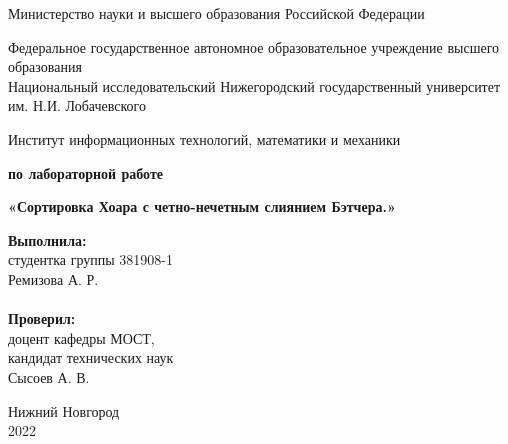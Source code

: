 \documentclass{report}
\begin{document}
\begin{titlepage}

\begin{center}
Министерство науки и высшего образования Российской Федерации
\end{center}

\begin{center}
Федеральное государственное автономное образовательное учреждение высшего образования \\
Национальный исследовательский Нижегородский государственный университет им. Н.И. Лобачевского
\end{center}

\begin{center}
Институт информационных технологий, математики и механики
\end{center}

\vspace{4em}

\begin{center}
\textbf{ по лабораторной работе} \\
\end{center}
\begin{center}
\textbf{\Large«Сортировка Хоара с четно-нечетным слиянием Бэтчера.»} \\
\end{center}

\vspace{4em}

\newbox{\lbox}
\newlength{\maxl}
\setlength{\maxl}{\wd\lbox}
\hfill\parbox{7cm}{
\hspace*{5cm}\hspace*{-5cm}\textbf{Выполнила:} \\ студентка группы 381908-1 \\ Ремизова А. Р.\\
\\
\hspace*{5cm}\hspace*{-5cm}\textbf{Проверил:}\\ доцент кафедры МОСТ, \\ кандидат технических наук \\ Сысоев А. В.\\
}
\vspace{\fill}

\begin{center} Нижний Новгород \\ 2022 \end{center}

\end{titlepage}
\end{document}
